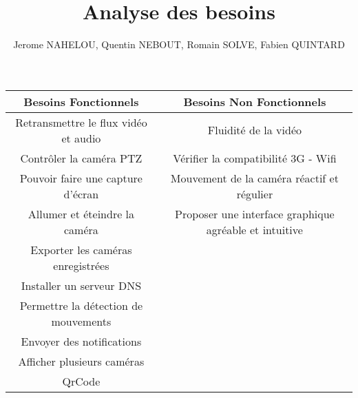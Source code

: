 \documentclass[a4paper,10pt]{report}
\begin{document}
\title{Analyse des besoins}
\author{Jerome NAHELOU, Quentin NEBOUT, Romain SOLVE, Fabien QUINTARD}


 \begin{center}
   \begin{tabular}{|c|c}
    \hline
   Besoins Fonctionnels & Besoins Non Fonctionnels\\
    \hline
    Retransmettre le flux vidéo et audio & Fluidité de la vidéo\\
    Contrôler la caméra PTZ & Vérifier la compatibilité 3G - Wifi\\
    Pouvoir faire une capture d'écran & Mouvement de la caméra réactif et
    régulier\\ Allumer et éteindre la caméra & Proposer une interface graphique agréable et
    intuitive\\
    Exporter les caméras enregistrées &\\
    Installer un serveur DNS &\\
    Permettre la détection de mouvements &\\
    Envoyer des notifications &\\
    Afficher plusieurs caméras &\\
    QrCode &\\
    \hline
   \end{tabular}
  \end{center}
  
\end{document}
